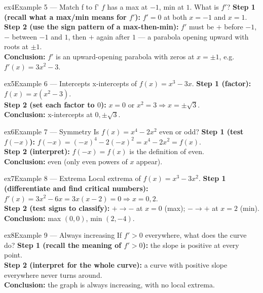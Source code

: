 \documentclass[11pt]{article}
\begin{document}
\begin{example}{ex4}{Example 5 --- Match f to f'}
$f$ has a max at $-1$, min at $1$. What is $f'$?\soln
\textbf{Step 1 (recall what a max/min means for $f'$):} $f'=0$ at both $x=-1$ and $x=1$.\\[3pt]
\textbf{Step 2 (use the sign pattern of a max-then-min):} $f'$ must be $+$ before $-1$, $-$ between $-1$ and $1$, then $+$ again after $1$ --- a parabola opening upward with roots at $\pm1$.\\[3pt]
\textbf{Conclusion:} $f'$ is an upward-opening parabola with zeros at $x=\pm1$, e.g.\ $f'(x)=3x^2-3$.
\end{example}

\begin{example}{ex5}{Example 6 --- Intercepts}
x-intercepts of $f(x)=x^3-3x$.\soln
\textbf{Step 1 (factor):} $f(x)=x(x^2-3)$.\\[3pt]
\textbf{Step 2 (set each factor to $0$):} $x=0$ or $x^2=3\Rightarrow x=\pm\sqrt3$.\\[3pt]
\textbf{Conclusion:} x-intercepts at $0,\pm\sqrt3$.
\end{example}

\begin{example}{ex6}{Example 7 --- Symmetry}
Is $f(x)=x^4-2x^2$ even or odd?\soln
\textbf{Step 1 (test $f(-x)$):} $f(-x)=(-x)^4-2(-x)^2=x^4-2x^2=f(x)$.\\[3pt]
\textbf{Step 2 (interpret):} $f(-x)=f(x)$ is the definition of even.\\[3pt]
\textbf{Conclusion:} even (only even powers of $x$ appear).
\end{example}

\begin{example}{ex7}{Example 8 --- Extrema}
Local extrema of $f(x)=x^3-3x^2$.\soln
\textbf{Step 1 (differentiate and find critical numbers):} $f'(x)=3x^2-6x=3x(x-2)=0\Rightarrow x=0,2$.\\[3pt]
\textbf{Step 2 (test signs to classify):} $+\to-$ at $x=0$ (max); $-\to+$ at $x=2$ (min).\\[3pt]
\textbf{Conclusion:} max $(0,0)$, min $(2,-4)$.
\end{example}

\begin{example}{ex8}{Example 9 --- Always increasing}
If $f'>0$ everywhere, what does the curve do?\soln
\textbf{Step 1 (recall the meaning of $f'>0$):} the slope is positive at every point.\\[3pt]
\textbf{Step 2 (interpret for the whole curve):} a curve with positive slope everywhere never turns around.\\[3pt]
\textbf{Conclusion:} the graph is always increasing, with no local extrema.
\end{example}
\end{document}
